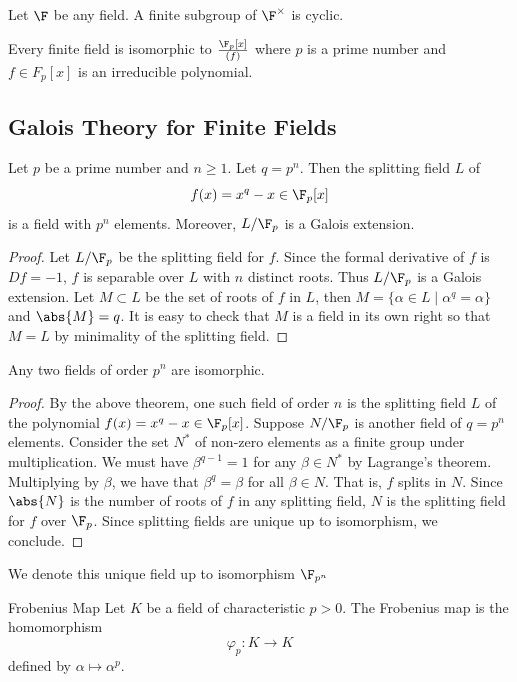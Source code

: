 \documentclass[a4paper]{article}
\begin{document}
\begin{lmm}{}{} Let $\F$ be any field. A finite subgroup of $\F^\times$ is cyclic. 
\end{lmm}

\begin{prp}{}{} Every finite field is isomorphic to $\frac{\F_p[x]}{(f)}$ where $p$ is a prime number and $f\in F_p[x]$ is an irreducible polynomial. 
\end{prp}

\subsection{Galois Theory for Finite Fields}
\begin{thm}{}{} Let $p$ be a prime number and $n\geq 1$. Let $q=p^n$. Then the splitting field $L$ of $$f(x)=x^q-x\in \F_p[x]$$ is a field with $p^n$ elements. Moreover, $L/\F_p$ is a Galois extension. 
\begin{proof}
Let $L/\F_p$ be the splitting field for $f$. Since the formal derivative of $f$ is $Df=-1$, $f$ is separable over $L$ with $n$ distinct roots. Thus $L/\F_p$ is a Galois extension. Let $M\subset L$ be the set of roots of $f$ in $L$, then $M=\{\alpha\in L\;|\;\alpha^q=\alpha\}$ and $\abs{M}=q$. It is easy to check that $M$ is a field in its own right so that $M=L$ by minimality of the splitting field. 
\end{proof}
\end{thm}

\begin{prp}{}{} Any two fields of order $p^n$ are isomorphic. 
\begin{proof}
By the above theorem, one such field of order $n$ is the splitting field $L$ of the polynomial $f(x)=x^q-x\in\F_p[x]$. Suppose $N/\F_p$ is another field of $q=p^n$ elements. Consider the set $N^\ast$ of non-zero elements as a finite group under multiplication. We must have $\beta^{q-1}=1$ for any $\beta\in N^\ast$ by Lagrange's theorem. Multiplying by $\beta$, we have that $\beta^q=\beta$ for all $\beta\in N$. That is, $f$ splits in $N$. Since $\abs{N}$ is the number of roots of $f$ in any splitting field, $N$ is the splitting field for $f$ over $\F_p$. Since splitting fields are unique up to isomorphism, we conclude. 
\end{proof}
\end{prp}

We denote this unique field up to isomorphism $\F_{p^n}$

\begin{defn}{Frobenius Map}{} Let $K$ be a field of characteristic $p>0$. The Frobenius map is the homomorphism $$\varphi_p:K\to K$$ defined by $\alpha\mapsto\alpha^p$. 
\end{defn}
\end{document}
